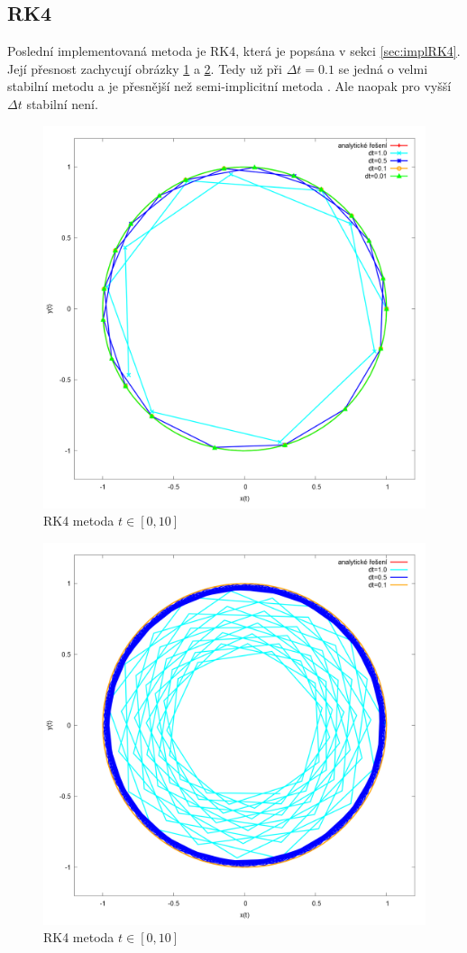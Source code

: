 \subsection{RK4}
Poslední implementovaná metoda je RK4, která je popsána v sekci \ref{sec:implRK4}. Její přesnost zachycují obrázky \ref{fig:RK4} a \ref{fig:RK4Stab}. Tedy už při $ \Delta t=0.1 $ se jedná o velmi stabilní metodu a je přesnější než semi-implicitní metoda . Ale naopak pro vyšší  $ \Delta t$ stabilní není.
\begin{figure}
	\caption{RK4 metoda $ t\in [0,10] $}
	\label{fig:RK4} 
	\centering
	\includegraphics[width=\linewidth]{Figs/RK4}
\end{figure}
\begin{figure}
	\caption{RK4 metoda $ t\in [0,10] $}
	\label{fig:RK4Stab} 
	\centering
	\includegraphics[width=\linewidth]{Figs/RK4Stab}
\end{figure}
\FloatBarrier
